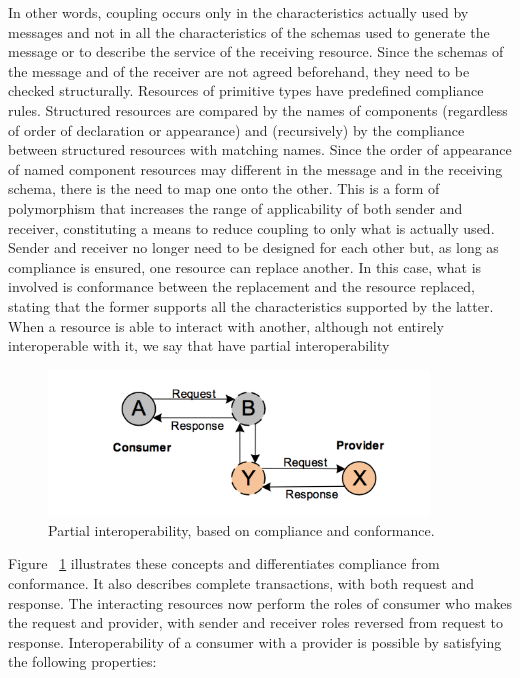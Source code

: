 In other words, coupling occurs only in the characteristics actually used by messages and not in all the characteristics of the schemas used to generate the message or to describe the service of the receiving resource. Since the schemas of
the message and of the receiver are not agreed beforehand, they need to be checked structurally. Resources of primitive
types have predefined compliance rules. Structured resources are compared by the names of components (regardless of
order of declaration or appearance) and (recursively) by the compliance between structured resources with matching
names. Since the order of appearance of named component resources may different in the message and in the receiving
schema, there is the need to map one onto the other. This is a form of polymorphism that increases the range of
applicability of both sender and receiver, constituting a means to reduce coupling to only what is actually used.
Sender and receiver no longer need to be designed for each other but, as long as compliance is ensured, one resource
can replace another. In this case, what is involved is conformance between the replacement and the resource
replaced, stating that the former supports all the characteristics supported by the latter. When a resource is able to
interact with another, although not entirely interoperable with it, we say that have partial interoperability

\begin{figure}[!htb]
  \centering
  \includegraphics[width=0.9\textwidth]{Figures/partial.png}
  \caption[Partial interoperability, based on compliance and conformance.]{Partial interoperability, based on compliance and conformance.}
  \label{fig:Partial}
\end{figure}

Figure ~\ref{fig:Partial} illustrates these concepts and differentiates compliance from conformance. It also describes complete
transactions, with both request and response. The interacting resources now perform the roles of consumer who makes
the request and provider, with sender and receiver roles reversed from request to response. Interoperability of a
consumer with a provider is possible by satisfying the following properties:

